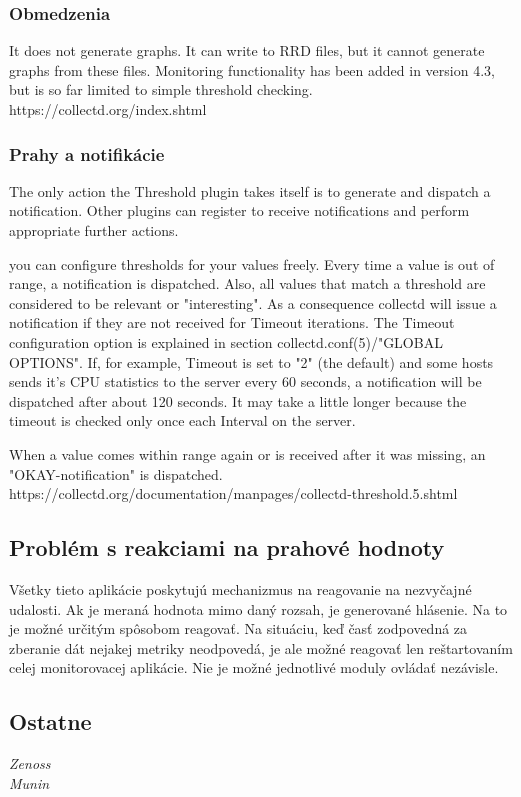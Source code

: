 \documentclass[11pt,final,oneside]{fithesis}
\begin{document}
\subsubsection{Obmedzenia}
It does not generate graphs. It can write to RRD files, but it cannot generate graphs from these files. 
Monitoring functionality has been added in version 4.3, but is so far limited to simple threshold checking. 
https://collectd.org/index.shtml

\subsubsection{Prahy a notifikácie}

The only action the Threshold plugin takes itself is to generate and dispatch a notification. Other plugins can register to receive notifications and perform appropriate further actions.

you can configure thresholds for your values freely. Every time a value is out of range, a notification is dispatched. 
Also, all values that match a threshold are considered to be relevant or "interesting". As a consequence collectd will issue a notification if they are not received for Timeout iterations. The Timeout configuration option is explained in section collectd.conf(5)/"GLOBAL OPTIONS". If, for example, Timeout is set to "2" (the default) and some hosts sends it's CPU statistics to the server every 60 seconds, a notification will be dispatched after about 120 seconds. It may take a little longer because the timeout is checked only once each Interval on the server.

When a value comes within range again or is received after it was missing, an "OKAY-notification" is dispatched.
https://collectd.org/documentation/manpages/collectd-threshold.5.shtml

\subsection{Problém s reakciami na prahové hodnoty}
Všetky tieto aplikácie poskytujú mechanizmus na reagovanie na nezvyčajné udalosti. Ak je meraná hodnota mimo daný rozsah, je generované hlásenie. Na to je možné určitým spôsobom reagovať.
Na situáciu, keď časť zodpovedná za zberanie dát nejakej metriky neodpovedá, je ale možné reagovať len reštartovaním celej monitorovacej aplikácie. Nie je možné jednotlivé moduly ovládať nezávisle.

\subsection{Ostatne} 
\begin{description}
\item[\emph{Zenoss}]
\item[\emph{Munin}]
\end{description}
\end{document}
